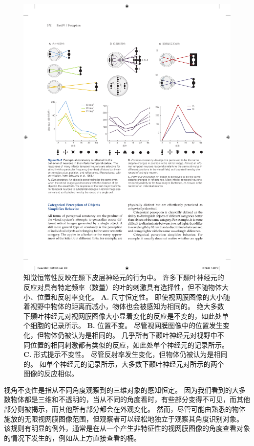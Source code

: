 \begin{figure}[htbp]
	\centering
	\includegraphics[width=1.0\linewidth]{chap24/fig_24_7}
	\caption{知觉恒常性反映在颞下皮层神经元的行为中。
		许多下颞叶神经元的反应对具有特定频率（数量）的叶的刺激具有选择性，但不随物体大小、位置和反射率变化。
		\textbf{A.} 尺寸恒定性。
		即使视网膜图像的大小随着视野中物体的距离而减小，物体也会被感知为相同的。
		绝大多数下颞叶神经元对视网膜图像大小显着变化的反应是不变的，如此处单个细胞的记录所示。
		\textbf{B.} 位置不变。
		尽管视网膜图像中的位置发生变化，但物体仍被认为是相同的。
		几乎所有下颞叶神经元对视野中不同位置的相同刺激都有类似的反应，如此处单个神经元的记录所示。
		\textbf{C.} 形式提示不变性。
		尽管反射率发生变化，但物体仍被认为是相同的。
		如单个神经元的记录所示，大多数下颞叶神经元对所示的两个图像的反应相似。}
	\label{fig:24_7}
\end{figure}


视角不变性是指从不同角度观察到的三维对象的感知恒定。
因为我们看到的大多数物体都是三维和不透明的，当从不同的角度看时，有些部分变得不可见，而其他部分则被揭示，而其他所有部分都会在外观变化。
然而，尽管可能由熟悉的物体施放的无限视网膜图像范围，但观察者可以轻松地独立于观察其角度识别对象。
该规则有明显的例外，通常是在从一个产生非特征性的视网膜图像的角度查看对象的情况下发生的，例如从上方直接查看的桶。


